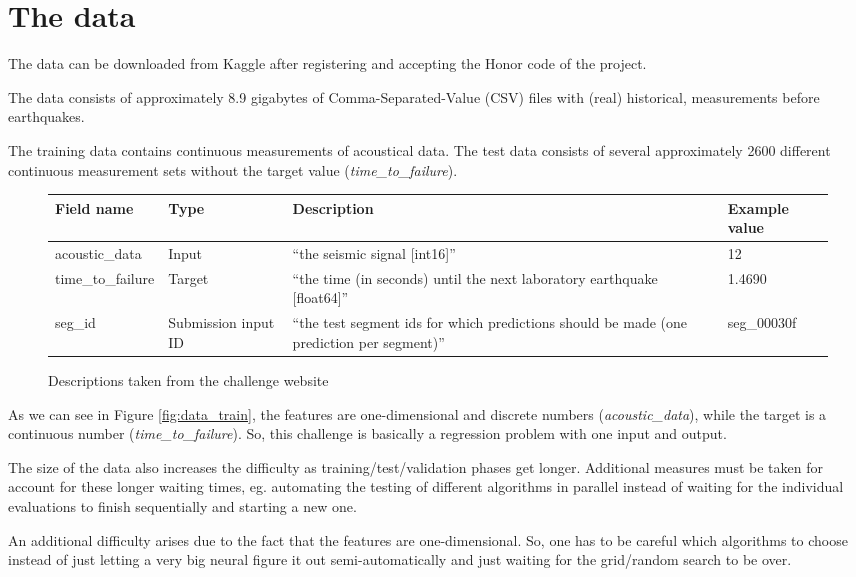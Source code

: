 \documentclass[colorback,accentcolor=tud9c,12pt]{tudreport}
\begin{document}
	\section{The data}
	The data can be downloaded from Kaggle after registering and accepting the Honor code of the project.
	
	The data consists of approximately 8.9 gigabytes of Comma-Separated-Value (CSV) files with (real) historical, measurements before earthquakes.
	
	The training data contains continuous measurements of acoustical data.
	The test data consists of several approximately 2600 different continuous measurement sets without the target value (\textit{time\_to\_failure}).
	
	
	\begin{figure}[htp]
		\begin{tabularx}{\textwidth}{ L{8}|L{5}|L{12}|L{7} }
			Field name & Type & Description & Example value \\
			\hline 
			acoustic\_data & Input & ``the seismic signal [int16]'' & 12 \\
			\hline 
			time\_to\_failure & Target & ``the time (in seconds) until the next laboratory earthquake [float64]''  & 1.4690 \\
			\hline 
			seg\_id & Submission input ID & ``the test segment ids for which predictions should be made (one prediction per segment)'' & seg\_00030f \\
		\end{tabularx}
		\caption{Descriptions taken from the challenge website}
	\end{figure}
	
	
	As we can see in Figure \ref{fig:data_train}, the features are one-dimensional and discrete numbers (\textit{acoustic\_data}), while the target is a continuous number (\textit{time\_to\_failure}).
	So, this challenge is basically a regression problem with one input and output.
	
	
	The size of the data also increases the difficulty as training/test/validation phases get longer. Additional measures must be taken for account for these longer waiting times, eg. automating the testing of different algorithms in parallel instead of waiting for the individual evaluations to finish sequentially and starting a new one.
	
	An additional difficulty arises due to the fact that the features are one-dimensional. So, one has to be careful which algorithms to choose instead of just letting a very big neural figure it out semi-automatically and just waiting for the grid/random search to be over.
	
\end{document}
